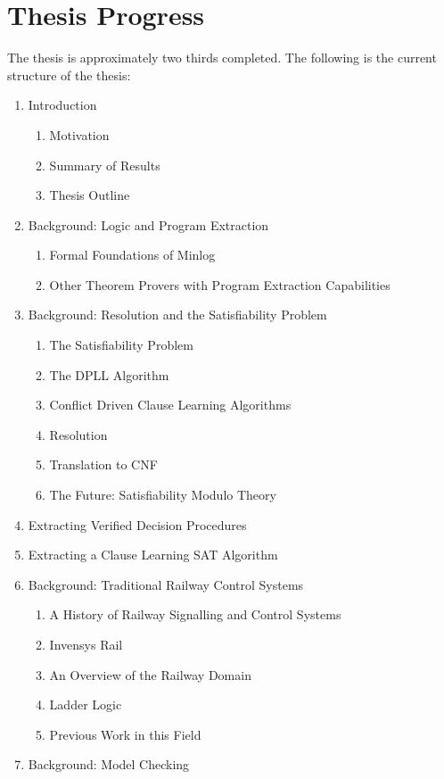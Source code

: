 \documentclass{article}
\begin{document}
\section{Thesis Progress}
The thesis is approximately two thirds completed. The following is the current structure of the thesis: 
\begin{enumerate}
\item  Introduction  
\begin{enumerate}  [label*=\arabic*.]
\item  Motivation 
\item  Summary of Results
\item  Thesis Outline
\end{enumerate}
\item Background: Logic and Program Extraction 
\begin{enumerate}[label*=\arabic*.]
\item Formal Foundations of Minlog 
\item  Other Theorem Provers with Program Extraction Capabilities
\end{enumerate}
\item Background: Resolution and the Satisfiability Problem 
\begin{enumerate}[label*=\arabic*.]
\item The Satisfiability Problem
\item The DPLL Algorithm
\item Conflict Driven Clause Learning Algorithms
\item Resolution
\item Translation to CNF
\item The Future: Satisfiability Modulo Theory
\end{enumerate}
\item Extracting Verified Decision Procedures 
\item Extracting a Clause Learning SAT Algorithm
\item Background: Traditional Railway Control Systems 
\begin{enumerate}[label*=\arabic*.]
\item A History of Railway Signalling and Control Systems 
\item Invensys Rail 
\item An Overview of the Railway Domain 
\item Ladder Logic 
\item Previous Work in this Field
\end{enumerate}
\item Background: Model Checking 

\end{enumerate}
\end{document}
